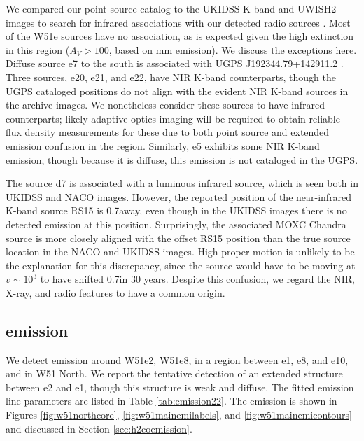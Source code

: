 We compared our point source catalog to the UKIDSS K-band and UWISH2 \hh images
to search for infrared associations with our detected radio sources
\citep{Lucas2008a,Froebrich2011a}.  Most of the W51e sources have no
association, as is expected given the high extinction in this region
($A_V>100$, based on mm emission).  We discuss the exceptions here.  Diffuse
source e7 to the south is associated with UGPS
J192344.79+142911.2 \citep{Lucas2008a}.  Three sources, e20, e21, and
e22, have NIR K-band counterparts, though the UGPS cataloged positions do not
align with the evident NIR K-band sources in the archive images. We nonetheless
consider these sources
to have infrared counterparts; likely adaptive optics imaging will be required
to obtain reliable flux density measurements for these due to both point source
and extended emission confusion in the region.   Similarly, e5 exhibits some
NIR K-band emission, though because it is diffuse, this emission is
not cataloged in the UGPS.

The source d7 is associated with a luminous infrared source, which is
seen both in UKIDSS \citep{Lucas2008a} and NACO \citep{Figueredo2008a} images.
However, the reported position of the near-infrared K-band
\citet{Goldader1994a} source RS15 is
0.7\arcsec away, even though in the UKIDSS images there is no detected emission
at this position.  Surprisingly, the associated MOXC Chandra source
\citep{Townsley2014a} is more closely aligned with the offset RS15 position
than the true source location in the NACO and UKIDSS images.  High proper motion
is unlikely to be the explanation for this discrepancy, since the source
would have to be moving at $v\sim10^3$ \kms to have shifted 0.7\arcsec in 30
years.  Despite this confusion, we regard the NIR, X-ray, and radio features to
have a common
origin.


\subsection{\formaldehyde \twotwo emission}
\label{sec:twotwoemission}
We detect \formaldehyde \twotwo emission around W51e2, W51e8, in a region
between e1, e8, and e10, and in W51 North.  We report the tentative detection
of an extended structure between e2 and e1, though this structure is weak
and diffuse.  The fitted
emission line parameters are listed in Table \ref{tab:emission22}.  The
emission is shown in Figures \ref{fig:w51northcore},
\ref{fig:w51mainemilabels}, and \ref{fig:w51mainemicontours} and discussed in
Section \ref{sec:h2coemission}.

